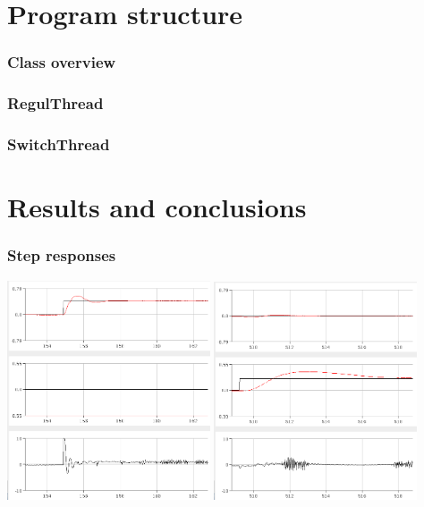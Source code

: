 \documentclass[
compress]
{beamer}
\begin{document}
\section{Program structure}
\frame{\sectionpage}
\begin{frame}
\frametitle{Class overview}

\end{frame}

\begin{frame}
\frametitle{RegulThread}

\end{frame}

\begin{frame}
\frametitle{SwitchThread}

\end{frame}

\section{Results and conclusions}
\frame{\sectionpage}
\begin{frame}
\frametitle{Step responses}
\centering
\includegraphics[width=0.45\textwidth]{figures/stepresponsebeam-crop.png}
\hspace{1em}
\includegraphics[width=0.45\textwidth]{figures/stepresponseball1-crop.png}
\end{frame}
\end{document}
